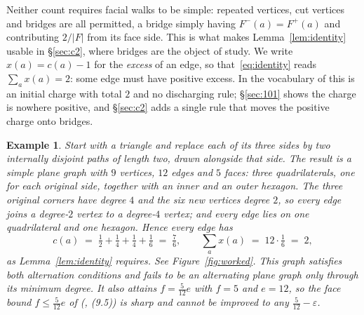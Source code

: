 \documentclass{baustms}
\theoremstyle{cupthm}
\theoremstyle{cupdefn}
\newtheorem{example}[theorem]{Example}
\theoremstyle{cuprem}
\begin{document}
Neither count requires facial walks to be simple: repeated vertices, cut vertices
and bridges are all permitted, a bridge simply having $F^-(a) = F^+(a)$ and
contributing $2/|F|$ from its face side. This is what makes
Lemma~\ref{lem:identity} usable in \S\ref{sec:c2}, where bridges are the object
of study. We write $x(a) = c(a) - 1$ for the \emph{excess} of an edge, so
that~\eqref{eq:identity} reads $\sum_a x(a) = 2$: some edge must have positive
excess. In the vocabulary of \cite{CW2017} this is an initial charge with total
$2$ and no discharging rule; \S\ref{sec:101} shows the charge is nowhere
positive, and \S\ref{sec:c2} adds a single rule that moves the positive charge
onto bridges.

\begin{example}\label{ex:worked}
Start with a triangle and replace each of its three sides by two internally
disjoint paths of length two, drawn alongside that side. The result is a simple
plane graph with $9$ vertices, $12$ edges and $5$ faces: three quadrilaterals,
one for each original side, together with an inner and an outer hexagon. The
three original corners have degree $4$ and the six new vertices degree $2$, so
every edge joins a degree-$2$ vertex to a degree-$4$ vertex; and every edge lies
on one quadrilateral and one hexagon. Hence every edge has
\[
  c(a) \;=\; \tfrac12 + \tfrac14 + \tfrac14 + \tfrac16 \;=\; \tfrac76,
  \qquad
  \sum_a x(a) \;=\; 12 \cdot \tfrac16 \;=\; 2 ,
\]
as Lemma~\ref{lem:identity} requires. See Figure~\ref{fig:worked}.
This graph satisfies both alternation
conditions and fails to be an alternating plane graph only through its minimum
degree. It also attains $f = \tfrac{5}{12}e$ with $f=5$ and $e=12$, so the face
bound $f \le \tfrac5{12}e$ of (\cite{AHSSV2015}, (9.5)) is sharp and cannot be
improved to any $\tfrac5{12}-\varepsilon$.
\end{example}
\end{document}
